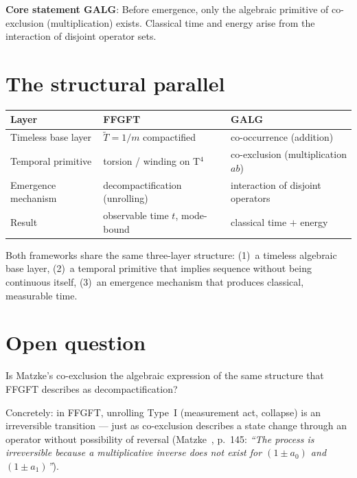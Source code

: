 \textbf{Core statement GALG}:
Before emergence, only the algebraic primitive of co-exclusion
(multiplication) exists.
Classical time and energy arise from the interaction of
disjoint operator sets.

\section{The structural parallel}

\begin{center}
\begin{tabular}{lll}
\toprule
\textbf{Layer} & \textbf{FFGFT} & \textbf{GALG} \\
\midrule
Timeless base layer
  & $\tilde{T}=1/m$ compactified
  & co-occurrence (addition) \\
Temporal primitive
  & torsion / winding on T$^4$
  & co-exclusion (multiplication $ab$) \\
Emergence mechanism
  & decompactification (unrolling)
  & interaction of disjoint operators \\
Result
  & observable time $t$, mode-bound
  & classical time $+$ energy \\
\bottomrule
\end{tabular}
\end{center}

Both frameworks share the same three-layer structure:
(1)~a timeless algebraic base layer,
(2)~a temporal primitive that implies sequence without being
continuous itself,
(3)~an emergence mechanism that produces classical, measurable time.

\section{Open question}

Is Matzke's co-exclusion the algebraic expression of the same
structure that FFGFT describes as decompactification?

Concretely: in FFGFT, unrolling Type~I (measurement act, collapse)
is an irreversible transition --- just as co-exclusion describes
a state change through an operator without possibility of reversal
(Matzke~\cite{Matzke2002}, p.~145:
\textit{``The process is irreversible because a multiplicative
inverse does not exist for $(1\pm a_0)$ and $(1\pm a_1)$''}).

